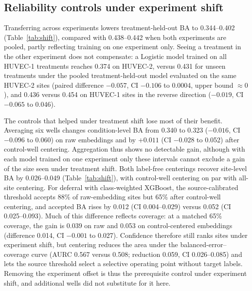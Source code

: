 \documentclass[conference]{IEEEtran}
\begin{document}
\subsection{Reliability controls under experiment shift}
Transferring across experiments lowers treatment-held-out BA to 0.344--0.402 (Table~\ref{tab:shift}), compared with 0.438--0.442 when both experiments are pooled, partly reflecting training on one experiment only. Seeing a treatment in the other experiment does not compensate: a Logistic model trained on all HUVEC-1 treatments reaches 0.374 on HUVEC-2, versus 0.431 for unseen treatments under the pooled treatment-held-out model evaluated on the same HUVEC-2 sites (paired difference $-0.057$, CI $-0.106$ to 0.0004, upper bound $\approx0$), and 0.436 versus 0.454 on HUVEC-1 sites in the reverse direction ($-0.019$, CI $-0.065$ to 0.046).

The controls that helped under treatment shift lose most of their benefit. Averaging six wells changes condition-level BA from 0.340 to 0.323 ($-0.016$, CI $-0.096$ to 0.060) on raw embeddings and by $+0.011$ (CI $-0.028$ to 0.052) after control-well centering. Aggregation thus shows no detectable gain, although with each model trained on one experiment only these intervals cannot exclude a gain of the size seen under treatment shift. Both label-free centerings recover site-level BA by 0.026--0.049 (Table~\ref{tab:shift}), with control-well centering on par with all-site centering. For deferral with class-weighted XGBoost, the source-calibrated threshold accepts 88\% of raw-embedding sites but 65\% after control-well centering, and accepted BA rises by 0.012 (CI 0.004--0.029) versus 0.052 (CI 0.025--0.093). Much of this difference reflects coverage: at a matched 65\% coverage, the gain is 0.039 on raw and 0.053 on control-centered embeddings (difference 0.014, CI $-0.001$ to 0.027). Confidence therefore still ranks sites under experiment shift, but centering reduces the area under the balanced-error--coverage curve (AURC 0.567 versus 0.508; reduction 0.059, CI 0.026--0.085) and lets the source threshold select a selective operating point without target labels. Removing the experiment offset is thus the prerequisite control under experiment shift, and additional wells did not substitute for it here.
\end{document}
